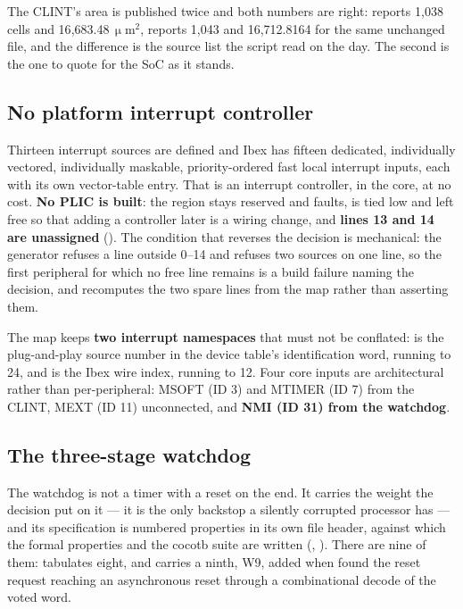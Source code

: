 The CLINT's area is published twice and both numbers are right:
 reports 1{,}038 cells and 16{,}683.48\,$\upmu$m$^2$,
 reports 1{,}043 and 16{,}712.8164 for the same
unchanged file, and the difference is the source list the script read on
the day. The second is the one to quote for the SoC as it stands.

\subsection{No platform interrupt controller}
\label{sec:arch-irq}

Thirteen interrupt sources are defined and Ibex has fifteen dedicated,
individually vectored, individually maskable, priority-ordered fast local
interrupt inputs, each with its own vector-table entry. That is an
interrupt controller, in the core, at no cost. \textbf{No PLIC is
built}: the region stays reserved and faults,  is
tied low and left free so that adding a controller later is a wiring
change, and \textbf{lines 13 and 14 are unassigned}
(). The condition that reverses the decision is
mechanical: the generator refuses a line outside 0--14 and refuses two
sources on one line, so the first peripheral for which no free line
remains is a build failure naming the decision, and
 recomputes the two spare lines from the
map rather than asserting them.

The map keeps \textbf{two interrupt namespaces} that must not be
conflated:  is the plug-and-play source number in the device
table's identification word, running to 24, and  is the Ibex
wire index, running to 12.  Four core inputs are architectural rather than
per-peripheral: MSOFT (ID 3) and MTIMER (ID 7) from the CLINT, MEXT
(ID 11) unconnected, and \textbf{NMI (ID 31) from the watchdog}.

\subsection{The three-stage watchdog}

The watchdog is not a timer with a reset on the end. It carries the
weight the  decision put on it --- it is the only
backstop a silently corrupted processor has --- and its specification is
numbered properties in its own file header, against which the
formal properties and the cocotb suite are written
(, ). There are nine of them:
 tabulates eight, and  carries a
ninth, W9, added when  found the reset request reaching an
asynchronous reset through a combinational decode of the voted word.

